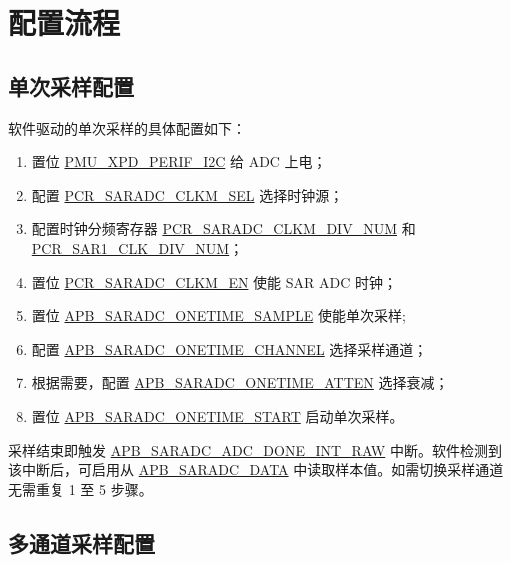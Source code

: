 \documentclass[main\_\_CN.tex]{subfiles}
\begin{document}
\section{配置流程}

\subsection{单次采样配置}

软件驱动的单次采样的具体配置如下：
\begin{enumerate}
    \item 置位 \hyperref[fielddesc:PMUXPDPERIFI2C]{PMU\_XPD\_PERIF\_I2C} 给 ADC 上电；
    \item 配置 \hyperref[fielddesc:PCRSARADCCLKMSEL]{PCR\_SARADC\_CLKM\_SEL} 选择时钟源；
    \item 配置时钟分频寄存器 \hyperref[fielddesc:PCRSARADCCLKMSEL]{PCR\_SARADC\_CLKM\_DIV\_NUM} 和 \hyperref[fielddesc:PCRSAR1CLKDIVNUM]{PCR\_SAR1\_CLK\_DIV\_NUM}；
    \item 置位 \hyperref[fielddesc:PCRSARADCCLKMEN]{PCR\_SARADC\_CLKM\_EN} 使能 SAR ADC 时钟；
    \item 置位 \hyperref[fielddesc:APBSARADCONETIMESAMPLE]{APB\_SARADC\_ONETIME\_SAMPLE} 使能单次采样;
    \item 配置 \hyperref[fielddesc:APBSARADCONETIMECHANNEL]{APB\_SARADC\_ONETIME\_CHANNEL} 选择采样通道；
    \item 根据需要，配置 \hyperref[fielddesc:APBSARADCONETIMEATTEN]{APB\_SARADC\_ONETIME\_ATTEN} 选择衰减；
    \item 置位 \hyperref[fielddesc:APBSARADCONETIMESTART]{APB\_SARADC\_ONETIME\_START} 启动单次采样。
\end{enumerate}

采样结束即触发 \hyperref[fielddesc:APBSARADCDONEINTRAW]{APB\_SARADC\_ADC\_DONE\_INT\_RAW} 中断。软件检测到该中断后，可启用从 \hyperref[fielddesc:APBSARADCDATA]{APB\_SARADC\_DATA} 中读取样本值。如需切换采样通道无需重复 1 至 5 步骤。
\subsection{多通道采样配置}
\end{document}
